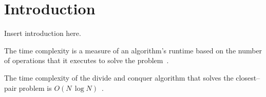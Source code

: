 \section{Introduction} %
Insert introduction here.

The time complexity is a measure of an algorithm's runtime
based on the number of operations that it executes to solve the
problem~\cite{Cormen2009}.

The time complexity of the divide and conquer algorithm that solves the
closest--pair problem is $O(N \, \log N)$~\cite{PereiraLobo2012}.
